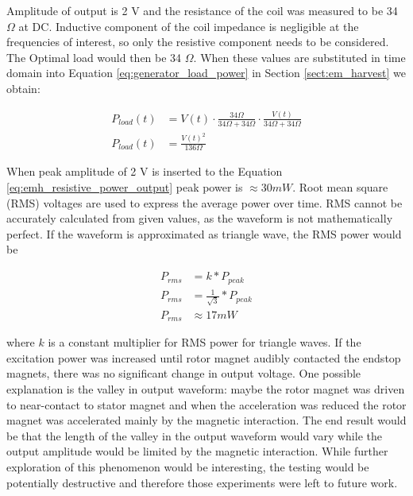Amplitude of output is 2 V and the resistance of the coil was measured to be 34 $\Omega$ at DC. Inductive component of the coil impedance is negligible at the frequencies of interest, so only the resistive component needs to be considered. The Optimal load would then be 34 $\Omega$. When these values are substituted in time domain into Equation \ref{eq:generator_load_power} in Section \ref{sect:em_harvest} we obtain:

\begin{equation}\label{eq:emh_resistive_power_output}
\begin{split}
  P_{load}(t)& = V(t) \cdot \frac{ 34 \Omega }{ 34 \Omega + 34 \Omega } \cdot \frac{ V(t) }{ 34 \Omega + 34 \Omega } \\
  P_{load}(t)& = \frac{V(t)^2}{136 \Omega}
\end{split}
\end{equation}

When peak amplitude of 2 V is inserted to the Equation \eqref{eq:emh_resistive_power_output} peak power is $ \approx 30 mW $. Root mean square (RMS) voltages are used to express the average power over time. RMS cannot be accurately calculated from given values, as the waveform is not  mathematically perfect. If the waveform is approximated as triangle wave, the RMS power would be 

\begin{equation} \label{eq:rms_power}
\begin{split}
  P_{rms}& = k * P_{peak} \\
  P_{rms}& = \frac{1}{\sqrt{3}} * P_{peak} \\
  P_{rms}& \approx 17 mW 
\end{split}
\end{equation}

where $k$ is a constant multiplier for RMS power for triangle waves. 
If the excitation power was increased until rotor magnet audibly contacted the endstop magnets, there was no significant change in output voltage. One possible explanation is the valley in output waveform: maybe the rotor magnet was driven to near-contact to stator magnet and when the acceleration was reduced the rotor magnet was accelerated mainly by the magnetic interaction. The end result would be that the length of the valley in the output waveform would vary while the output amplitude would be limited by the magnetic interaction. While further exploration of this phenomenon would be interesting, the testing would be potentially destructive and therefore those experiments were left to future work.

